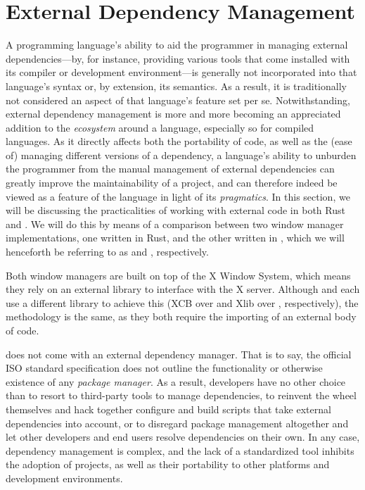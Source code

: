 \section{External Dependency Management}\label{extdepman}

A programming language's ability to aid the programmer in managing external
dependencies---by, for instance, providing various tools that come installed
with its compiler or development environment---is generally not incorporated
into that language's syntax or, by extension, its semantics. As a result, it is
traditionally not considered an aspect of that language's feature set per se.
Notwithstanding, external dependency management is more and more becoming an
appreciated addition to the \textit{ecosystem} around a language, especially
so for compiled languages. As it directly affects both the portability of
code, as well as the (ease of) managing different versions of a dependency, a
language's ability to unburden the programmer from the manual management of
external dependencies can greatly improve the maintainability of a project, and
can therefore indeed be viewed as a feature of the language in light of its
\textit{pragmatics}. In this section, we will be discussing the practicalities
of working with external code in both Rust and \cpp. We will do this by means of
a comparison between two window manager implementations, one written in Rust,
and the other written in \cpp, which we will henceforth be referring to as \wmrs
and \wmcpp, respectively.

Both window managers are built on top of the X Window System, which means
they rely on an external library to interface with the X server\cite{x11}.
Although \wmrs and \wmcpp each use a different library to achieve this (XCB over
\cite{xcb} and Xlib over \cite{xlib}, respectively), the
methodology is the same, as they both require the importing of an external body
of code.


\cpp does not come with an external dependency manager. That is to say, the
official ISO standard \cpp specification\cite{cppstd} does not outline the
functionality or otherwise existence of any \textit{package manager}. As a
result, developers have no other choice than to resort to third-party tools
to manage dependencies, to reinvent the wheel themselves and hack together
configure and build scripts that take external dependencies into account, or to
disregard package management altogether and let other developers and end users
resolve dependencies on their own. In any case, \cpp dependency management is
complex, and the lack of a standardized tool inhibits the adoption of \cpp
projects, as well as their portability to other platforms and development
environments.

